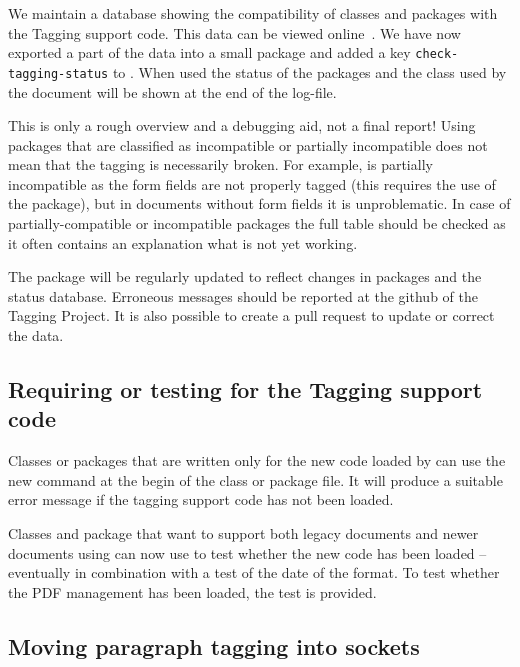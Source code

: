 \documentclass{ltnews}
\begin{document}
We maintain a database showing the compatibility of classes and packages with the Tagging support code. This data can be viewed online~\cite{tagging-status}. We have now exported a part of the data into a small package  and added a key \texttt{check-tagging-status} to . When used the status of the packages and the class used by the document will be shown at the end of the log-file.

This is only a rough overview and a debugging aid, not a final report!
Using packages that are classified as incompatible or partially incompatible 
does not mean that the tagging is necessarily broken. For example, 
is partially incompatible as the form fields are not properly tagged (this requires the use of the  package), but in documents without form fields it is unproblematic. In case of partially-compatible or incompatible packages the full table should be checked as it often contains an explanation what is not yet working.
    
The package  will be regularly updated to reflect changes
in packages and the status database. Erroneous messages should be reported at the github of the Tagging Project\cite{tagging-project}. It is also possible
to create a pull request to update or correct the data. 


\subsection{Requiring or testing for the Tagging support code}

Classes or packages that are written only for the new code loaded by
 can use the new command
 at the begin of the class or package
file. It will produce a suitable error message if the tagging support
code has not been loaded.

Classes and package that want to support both legacy documents and
newer documents using  can now use
 to test whether the new code has been loaded
-- eventually in combination with a test of the date of the format. To
test whether the PDF management has been loaded, the test
 is provided.

 
\subsection{Moving paragraph tagging into sockets}
\end{document}
